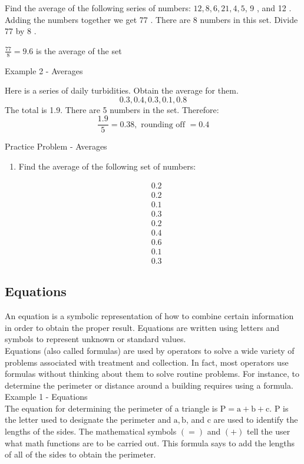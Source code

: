 Find the average of the following series of numbers: $12,8,6,21,4,5$, 9 , and 12 . Adding the numbers together we get 77 . There are 8 numbers in this set. Divide 77 by 8 .

$\frac{77}{8}=9.6$ is the average of the set

Example 2 - Averages

Here is a series of daily turbidities. Obtain the average for them.
$$
0.3,0.4,0.3,0.1,0.8
$$
The total is 1.9. There are 5 numbers in the set. Therefore:
$$
\frac{1.9}{5}=0.38, \text { rounding off }=0.4
$$

Practice Problem - Averages
\begin{enumerate}
  \item Find the average of the following set of numbers:
\end{enumerate}
$$
\begin{aligned}
&0.2 \\
&0.2 \\
&0.1 \\
&0.3 \\
&0.2 \\
&0.4 \\
&0.6 \\
&0.1 \\
&0.3
\end{aligned}
$$

\subsection{Equations}
An equation is a symbolic representation of how to combine certain information in order to obtain the proper result. Equations are written using letters and symbols to represent unknown or standard values.\\


Equations (also called formulas) are used by operators to solve a wide variety of problems associated with treatment and collection. In fact, most operators use formulas without thinking about them to solve routine problems. For instance, to determine the perimeter or distance around a building requires using a formula.\\

Example 1 - Equations\\
The equation for determining the perimeter of a triangle is $\mathrm{P}=\mathrm{a}+\mathrm{b}+\mathrm{c}$. $\mathrm{P}$ is the letter used to designate the perimeter and $\mathrm{a}, \mathrm{b}$, and $\mathrm{c}$ are used to identify the lengths of the sides. The mathematical symbols $(=)$ and $(+)$ tell the user what math functions are to be carried out. This formula says to add the lengths of all of the sides to obtain the perimeter.\\

